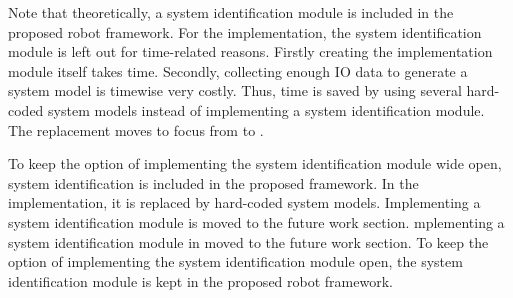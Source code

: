 
Note that theoretically, a system identification module is included in the proposed robot framework. For the implementation, the system identification module is left out for time-related reasons. Firstly creating the implementation module itself takes time. Secondly, collecting enough \ac{IO} data to generate a system model is timewise very costly. Thus, time is saved by using several hard-coded system models instead of implementing a system identification module. The replacement moves to focus from  to .\bs

To keep the option of implementing the system identification module wide open, system identification is included in the proposed framework. In the implementation, it is replaced by hard-coded system models. Implementing a system identification module is moved to the future work section.\bs
mplementing a system identification module in moved to the future work section. To keep the option of implementing the system identification module open, the system identification module is kept in the proposed robot framework.\bs
